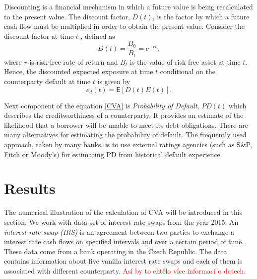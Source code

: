 \documentclass[a4paper,12pt]{report}
\theoremstyle{definition} \newtheorem{definice}[veta]{Definice}
\theoremstyle{remark}
\begin{document}
Discounting is a financial mechanism in which a future value is being recalculated to the present value.
The discount factor, $D(t)$, is the factor by which a future cash flow must be multiplied in order to obtain the present value.
Consider the discount factor at time $t$%
, defined as 
\begin{equation}
D(t)=\frac{B_0}{B_t}=e^{-rt},
\end{equation}
where $r$ is risk-free rate of return and $B_t$ is the value of risk free asset at time $t$. 
Hence, the discounted expected exposure at time $t$ conditional on the counterparty default at time $t$ is given by 
\begin{equation}
\hat{e}_d(t)=\mathsf{E}[D(t) E(t)].
\end{equation}

Next component of the equation \eqref{CVA} is \textit{Probability of Default}, $PD(t)$ which describes the creditworthiness of a counterparty. 
It provides an estimate of the likelihood that a borrower will be unable to meet its debt obligations.
There are many alternatives for estimating the probability of default.
The frequently used approach, taken by many banks, is to use external ratings agencies (such as S\&P, Fitch or Moody's) for estimating PD from historical default experience.


\section{Results}
The numerical illustration of the calculation of CVA will be introduced in this section. 
We work with data set of interest rate swaps from the year 2015.
An \textit{interest rate swap (IRS)} is an agreement between two parties to exchange a interest rate cash flows on specified intervals and over a certain period of time. 
These data come from a bank operating in the Czech Republic. 
The data contains information about five vanilla interest rate swaps and each of them is associated with different counterparty. \textcolor{red}{Asi by to chtělo více informací o datech.}

\begin{table}[!htbp]
\centering
\caption{Variables in a data set}  \label{variable}
\end{table}
\end{document}
